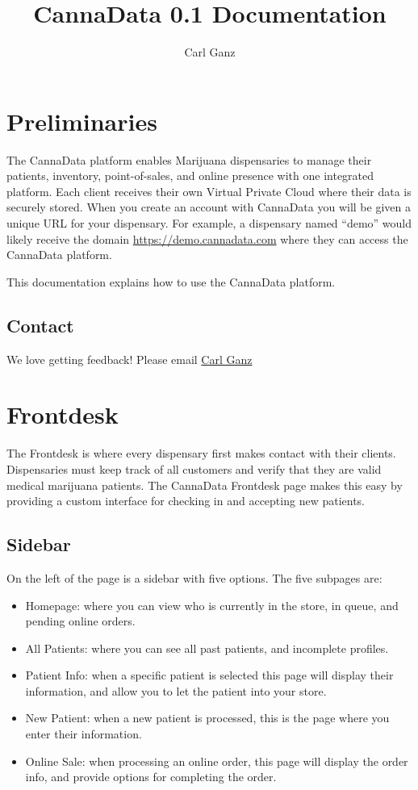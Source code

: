 \documentclass[]{book}
\title{CannaData 0.1 Documentation}
\author{Carl Ganz}
\date{}
\theoremstyle{definition}
\theoremstyle{definition}
\theoremstyle{definition}
\theoremstyle{remark}
\begin{document}
\maketitle

{
\setcounter{tocdepth}{1}
\tableofcontents
}
\chapter{Preliminaries}\label{preliminaries}

The CannaData platform enables Marijuana dispensaries to manage their
patients, inventory, point-of-sales, and online presence with one
integrated platform. Each client receives their own Virtual Private
Cloud where their data is securely stored. When you create an account
with CannaData you will be given a unique URL for your dispensary. For
example, a dispensary named ``demo'' would likely receive the domain
\url{https://demo.cannadata.com} where they can access the CannaData
platform.

This documentation explains how to use the CannaData platform.

\section{Contact}\label{contact}

We love getting feedback! Please email
\href{mailto:carl@cannadatasolutions.com}{Carl Ganz}

\chapter{Frontdesk}\label{frontdesk}

The Frontdesk is where every dispensary first makes contact with their
clients. Dispensaries must keep track of all customers and verify that
they are valid medical marijuana patients. The CannaData Frontdesk page
makes this easy by providing a custom interface for checking in and
accepting new patients.

\section{Sidebar}\label{sidebar}

On the left of the page is a sidebar with five options. The five
subpages are:

\begin{itemize}
\item
  Homepage: where you can view who is currently in the store, in queue,
  and pending online orders.
\item
  All Patients: where you can see all past patients, and incomplete
  profiles.
\item
  Patient Info: when a specific patient is selected this page will
  display their information, and allow you to let the patient into your
  store.
\item
  New Patient: when a new patient is processed, this is the page where
  you enter their information.
\item
  Online Sale: when processing an online order, this page will display
  the order info, and provide options for completing the order.
\end{itemize}
\end{document}
